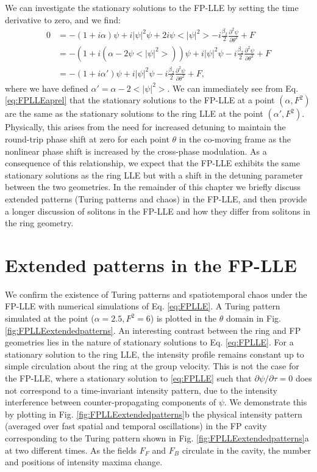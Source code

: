 We can investigate the stationary solutions to the FP-LLE by setting the time derivative to zero, and we find:
\begin{align}
0&=-(1+i\alpha)\psi+i|\psi|^2\psi+2i\psi<|\psi|^2>-i\frac{\beta_2}{2}\frac{\partial^2\psi}{\partial\theta^2}+F\\
&=-\left(1+i(\alpha-2\psi<|\psi|^2>)\right)\psi+i|\psi|^2\psi-i\frac{\beta_2}{2}\frac{\partial^2\psi}{\partial\theta^2}+F\\
&=-(1+i\alpha')\psi+i|\psi|^2\psi-i\frac{\beta_2}{2}\frac{\partial^2\psi}{\partial\theta^2}+F,\label{eq:FPLLEaprel}
\end{align}
where we have defined $\alpha'=\alpha-2<|\psi|^2>$. We can immediately see from Eq. \ref{eq:FPLLEaprel} that the stationary solutions to the FP-LLE at a point $(\alpha,F^2)$ are the same as the stationary solutions to the ring LLE at the point $(\alpha',F^2)$. Physically, this arises from the need for increased detuning to maintain the round-trip phase shift at zero for each point $\theta$ in the co-moving frame as the nonlinear phase shift is increased by the cross-phase modulation. As a consequence of this relationship, we expect that the FP-LLE exhibits the same stationary solutions as the ring LLE but with a shift in the detuning parameter between the two geometries. In the remainder of this chapter we briefly discuss extended patterns (Turing patterns and chaos) in the FP-LLE, and then provide a longer discussion of solitons in the FP-LLE and how they differ from solitons in the ring geometry.

\section{Extended patterns in the FP-LLE}

We confirm the existence of Turing patterns and spatiotemporal chaos under the FP-LLE with numerical simulations of Eq. \ref{eq:FPLLE}. A Turing pattern simulated at the point ($\alpha=2.5,F^2=6$) is plotted in the $\theta$ domain in Fig. \ref{fig:FPLLEextendedpatterns}. An interesting contrast between the ring and FP geometries lies in the nature of stationary solutions to Eq. \ref{eq:FPLLE}. For a stationary solution to the ring LLE, the intensity profile remains constant up to simple circulation about the ring at the group velocity. This is not the case for the FP-LLE, where a stationary solution to \ref{eq:FPLLE} such that $\partial\psi/\partial\tau=0$ does not correspond to a time-invariant intensity pattern, due to the intensity interference between counter-propagating components of $\psi$. We demonstrate this by plotting in Fig. \ref{fig:FPLLEextendedpatterns}b the physical intensity pattern (averaged over fast spatial and temporal oscillations) in the FP cavity corresponding to the Turing pattern shown in Fig. \ref{fig:FPLLEextendedpatterns}a at two different times. As the fields $F_F$ and $F_B$ circulate in the cavity, the number and positions of intensity maxima change. 

